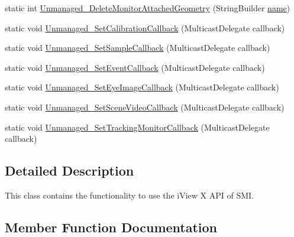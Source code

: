 \begin{DoxyCompactItemize}
\item 
static int \hyperlink{class_web_analyzer_1_1_eye_tracking_1_1_eye_tracking_controller_ab74dd311c26696870a55a3c46dcd154f}{Unmanaged\+\_\+\+Delete\+Monitor\+Attached\+Geometry} (String\+Builder \hyperlink{_u_i_2_h_t_m_l_resources_2js_2src_2create__experiment_8js_adac2bcb4f01b574cbc63fe8ee2c56bf0}{name})
\item 
static void \hyperlink{class_web_analyzer_1_1_eye_tracking_1_1_eye_tracking_controller_a3d01bc8585657ce26a4d0da0c0e4869c}{Unmanaged\+\_\+\+Set\+Calibration\+Callback} (Multicast\+Delegate callback)
\item 
static void \hyperlink{class_web_analyzer_1_1_eye_tracking_1_1_eye_tracking_controller_a6fc648481b2ff9195aa2506b4a5b2c73}{Unmanaged\+\_\+\+Set\+Sample\+Callback} (Multicast\+Delegate callback)
\item 
static void \hyperlink{class_web_analyzer_1_1_eye_tracking_1_1_eye_tracking_controller_ab04e26f47c782538e0838dcf2b58fa09}{Unmanaged\+\_\+\+Set\+Event\+Callback} (Multicast\+Delegate callback)
\item 
static void \hyperlink{class_web_analyzer_1_1_eye_tracking_1_1_eye_tracking_controller_acaff6bcefc00fbbf3595686d2650438d}{Unmanaged\+\_\+\+Set\+Eye\+Image\+Callback} (Multicast\+Delegate callback)
\item 
static void \hyperlink{class_web_analyzer_1_1_eye_tracking_1_1_eye_tracking_controller_a7bfc737e6966e52e75e3a9d5bb867720}{Unmanaged\+\_\+\+Set\+Scene\+Video\+Callback} (Multicast\+Delegate callback)
\item 
static void \hyperlink{class_web_analyzer_1_1_eye_tracking_1_1_eye_tracking_controller_a8e852cf8f14f6c52e94ffeb8a74b2a71}{Unmanaged\+\_\+\+Set\+Tracking\+Monitor\+Callback} (Multicast\+Delegate callback)
\end{DoxyCompactItemize}


\subsection{Detailed Description}
This class contains the functionality to use the i\+View X A\+P\+I of S\+M\+I. 



\subsection{Member Function Documentation}
\hypertarget{class_web_analyzer_1_1_eye_tracking_1_1_eye_tracking_controller_afe1ed106a76e89624985ce65488f5406}{}
